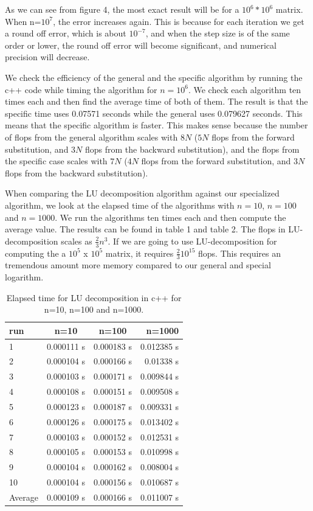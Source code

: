 \documentclass[%
oneside,                 %
final,                   %
10pt]{article}
\begin{document}
As we can see from figure 4, the most exact result will be for a $10^6*10^6$ matrix. When n=$10^7$, the error increases again. This is because for each iteration we get a round off error, which is about $10^{-7}$, and when the step size is of the same order or lower, the round off error will become significant, and numerical precision will decrease.


We check the efficiency of the general and the specific algorithm by running the c++ code while timing the algorithm for $n=10^6$. We check each algorithm ten times each and then find the average time of both of them. The result is that the specific time uses 0.07571 seconds while the general uses 0.079627 seconds. This means that the specific algorithm is faster.
This makes sense because the number of flops from the general algorithm scales with $8N$ ($5N$ flops from the forward substitution, and $3N$ flops from the backward substitution), and the flops from the specific case scales with $7N$ ($4N$ flops from the forward substitution, and $3N$ flops from the backward substitution).

When comparing the LU decomposition algorithm against our specialized algorithm, we look at the elapsed time of the algorithms with $n=10$, $n=100$ and $n=1000$. We run the algorithms ten times each and then compute the average value. The results can be found in table 1 and table 2.
The flops in LU-decomposition scales as $\frac{2}{3} n^3$. If we are going to use LU-decomposition for computing the a $10^5$ x $10^5$ matrix, it requires $\frac{2}{3}10^{15}$ flops. This requires an tremendous amount more memory compared to our general and special logarithm.

\begin{table}[H]
    \centering
    \begin{tabular}{|l|c|c|r|}
    \hline
     run & n=10 & n=100 & n=1000\\
     \hline
      1  & 0.000111 s & 0.000183 s & 0.012385 s\\
      2  & 0.000104 s & 0.000166 s & 0.01338 s\\
      3  & 0.000103 s & 0.000171 s & 0.009844 s\\
      4  & 0.000108 s & 0.000151 s & 0.009508 s\\
      5  & 0.000123 s & 0.000187 s & 0.009331 s\\
      6  & 0.000126 s & 0.000175 s & 0.013402 s\\
      7  & 0.000103 s & 0.000152 s & 0.012531 s\\
      8  & 0.000105 s & 0.000153 s & 0.010998 s\\
      9  & 0.000104 s & 0.000162 s & 0.008004 s\\
      10 & 0.000104 s & 0.000156 s & 0.010687 s\\
      \hline
      Average & 0.000109 s & 0.000166 s & 0.011007 s\\
      \hline
    \end{tabular}
    \caption{Elapsed time for LU decomposition in c++ for n=10, n=100 and n=1000.}
    \label{tab:my_label}
\end{table}
\end{document}
